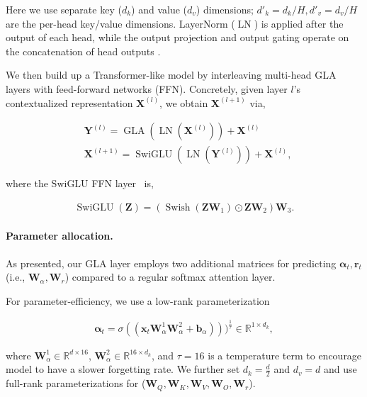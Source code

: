 Here we use separate key ($d_k$) and value ($d_v$) dimensions; $d'_k = d_k / H, d'_v = d_v / H$ are the per-head key/value dimensions. LayerNorm ($\operatorname{LN}$) is applied after the output of each head, while the output projection and output gating operate on the concatenation of head outputs \cite{sun2023retentive}. 

We then build up a Transformer-like model by interleaving multi-head GLA layers with feed-forward networks (FFN). Concretely, given layer $l$'s contextualized representation ${\mathbf{X}}^{(l)}$, we obtain  ${\mathbf{X}}^{(l+1)}$ via,

\begin{align*}

   &{\mathbf{Y}}^{(l)} = \operatorname{GLA}(\operatorname{LN}({\mathbf{X}}^{(l)})) + {\mathbf{X}}^{(l)} \\ 
   & {\mathbf{X}}^{(l+1)} = \operatorname{SwiGLU}(\operatorname{LN}({\mathbf{Y}}^{(l)})) + {\mathbf{X}}^{(l)},
\end{align*}

where the $\text{SwiGLU}$ FFN layer~\citep{touvron2023llama} is,

\begin{align*}
    \operatorname{SwiGLU}({\mathbf{Z}}) = (\operatorname{Swish}({\mathbf{Z}} {\bm{W}}_1) \odot {\mathbf{Z}} {\bm{W}}_2) {\bm{W}}_{3}.
\end{align*}

\paragraph{Parameter allocation.}  As presented, our GLA layer employs two additional matrices  for predicting ${\bm{\alpha}}_t, {\bm{r}}_t$ (i.e., ${\bm{W}}_\alpha, {\bm{W}}_r$) compared to a regular softmax attention layer. 

For parameter-efficiency, we use a low-rank parameterization

\begin{align*}
   {\bm{\alpha}}_t = \sigma(({\bm{x}}_t {\bm{W}}^1_\alpha {\bm{W}}^2_\alpha + {\bm{b}}_\alpha)))^{\frac{1}{\tau}}   \in \mathbb{R}^{1 \times d_k},
\end{align*}

where ${\bm{W}}^1_\alpha \in \mathbb{R}^{d \times 16}$, ${\bm{W}}^2_\alpha \in \mathbb{R}^{16 \times d_k}$, and $\tau = 16$ is a temperature term to encourage model to have a slower forgetting rate. We further set $d_k = \frac{d}{2}$ and $d_v = d$ and use  full-rank parameterizations for (${\bm{W}}_Q, {\bm{W}}_K, {\bm{W}}_V, {\bm{W}}_O, {\bm{W}}_r$). 

